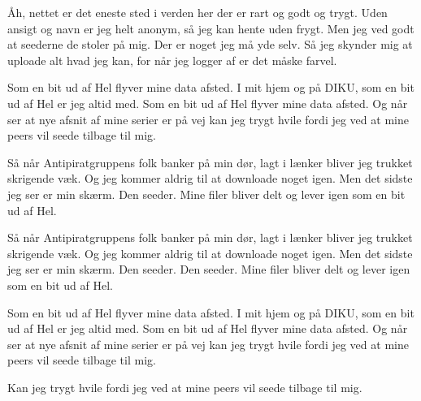 \documentclass[a4paper,11pt]{article}
\begin{document}
\begin{song}
      Åh, nettet er det eneste sted i verden her
      der er rart og godt og trygt.
      Uden ansigt og navn er jeg helt anonym,
      så jeg kan hente uden frygt.
      Men jeg ved godt at seederne de stoler på mig.
      Der er noget jeg må yde selv.
      Så jeg skynder mig at uploade alt hvad jeg kan,
      for når jeg logger af er det måske farvel.

      Som en bit ud af Hel flyver mine data afsted.
      I mit hjem og på DIKU, som en bit ud af Hel er jeg altid med. 
      Som en bit ud af Hel flyver mine data afsted.
      Og når ser at nye afsnit af mine serier er på vej
      kan jeg trygt hvile fordi jeg ved at mine peers 
      vil seede tilbage til mig.

%
      Så når Antipiratgruppens folk banker på min dør,
      lagt i lænker bliver jeg trukket skrigende væk.
      Og jeg kommer aldrig til at downloade noget igen.
      Men det sidste jeg ser er min skærm. 
      Den seeder.
      Mine filer bliver delt
      og lever igen
      som en bit ud af Hel.

      Så når Antipiratgruppens folk banker på min dør,
      lagt i lænker bliver jeg trukket skrigende væk.
      Og jeg kommer aldrig til at downloade noget igen.
      Men det sidste jeg ser er min skærm. 
      Den seeder.
      Den seeder. 
      Mine filer bliver delt
      og lever igen
      som en bit ud af Hel.

      Som en bit ud af Hel flyver mine data afsted.
      I mit hjem og på DIKU, som en bit ud af Hel er jeg altid med. 
      Som en bit ud af Hel flyver mine data afsted.
      Og når ser at nye afsnit af mine serier er på vej
      kan jeg trygt hvile fordi jeg ved at mine peers 
      vil seede tilbage til mig.

      Kan jeg trygt hvile fordi jeg ved at mine peers 
      vil seede tilbage til mig.
  \end{song}
\end{document}
